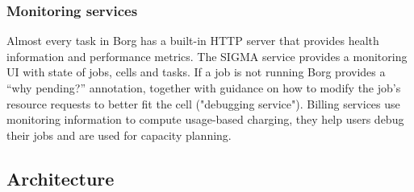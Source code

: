 		\subsubsection{Monitoring services}
		Almost every task in Borg has a built-in HTTP server that provides health information and performance metrics.\newline
		The SIGMA service provides a monitoring UI with state of jobs, cells and tasks.\newline
		If a job is not running	Borg provides a “why pending?” annotation, together with guidance on how to modify the job’s resource requests to better fit the cell ("debugging service").\newline
		Billing services use monitoring information to compute usage-based charging, they help users debug their jobs and are used for capacity planning.
	\subsection{Architecture}
